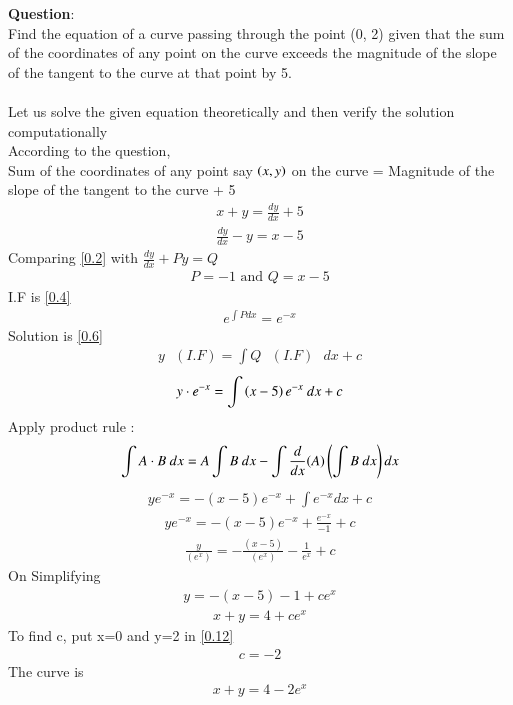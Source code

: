 \documentclass[journal]{IEEEtran}
\begin{document}
\textbf{Question}:\\
Find the equation of a curve passing through the point (0, 2) given that the sum of the coordinates of any point on the curve exceeds the magnitude of the slope of the tangent to the curve at that point by 5. \\ 
\solution \\
Let us solve the given equation theoretically and then verify the solution computationally \\
According to the question, \\
Sum of the coordinates of any point say $\left(x,y\right)$ on the curve = Magnitude of the slope of the tangent to the curve + 5 
\begin{align}
    x+y = \frac{dy}{dx} + 5 
\end{align}
\begin{align}
    \frac{dy}{dx} - y= x-5
    \label{0.2}
\end{align}
Comparing \ref{0.2} with $\frac{dy}{dx} + Py = Q$
\begin{align}
    P=-1 \text{ and } Q=x-5
\end{align}
I.F is \ref{0.4}
\begin{align}
    e^{\int P dx} = e^ {-x}
    \label{0.4}
\end{align}
Solution is \ref{0.6}
\begin{align}
    y\text{ }(I.F) = \int Q\text{ }(I.F)\text{ }dx + c 
\end{align}
\begin{align}
    y \cdot e^{-x} = \int \left(x-5\right) e^{-x} \text{ }dx +c 
    \label{0.6}
\end{align}
Apply product rule :
\begin{align}
    \int A\cdot B \text{ }dx = A \int B \text{ }dx - \int \frac{d}{dx}(A)\left(\int B \text{ }dx\right)dx
\end{align}
\begin{align}
     y e^{-x} = - (x-5)e^{-x} + \int e^{-x}  dx + c
 \end{align}
\begin{align}
     y e^{-x} = - (x-5)e^{-x} + \frac{e^{-x}}{-1} + c 
\end{align}
\begin{align}
     \frac{y}{(e^x)}= - \frac{(x-5)}{(e^{x})} - \frac{1}{e^x} + c
\end{align}
On Simplifying 
\begin{align}
     y = - (x-5) - 1 +c e^x
\end{align}
\begin{align}
    x+y = 4 + c e^x
    \label{0.12}
\end{align}
To find c, put x=0 and y=2 in \ref{0.12}
\begin{align}
    c = -2  
\end{align}
The curve is 
\begin{align}
   x+y = 4 -2e^x
\end{align}
\end{document}
